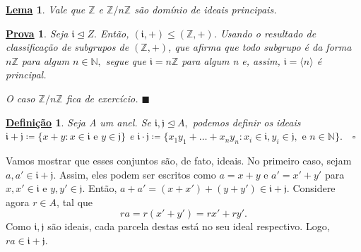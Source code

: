 \documentclass{article}
\newtheorem*{def*}{\underline{Defini\c c\~ao}}
\newtheorem*{lemma*}{\underline{Lema}}
\newtheorem*{proof*}{\underline{Prova}}
\renewcommand\qedsymbol{$\blacksquare$}
\begin{document}
\begin{lemma*}
  Vale que \(\mathbb{Z}\) e \(\mathbb{Z}/n \mathbb{Z}\) são domínio de ideais principais.
\end{lemma*}
\begin{proof*}
  Seja \(\mathfrak{i} \trianglelefteq{Z}.\) Então, \((\mathfrak{i}, +)\leq (\mathbb{Z}, +)\). Usando o resultado
  de classificação de subgrupos de \((\mathbb{Z}, +)\), que afirma que todo subgrupo é da forma \(n \mathbb{Z}\) para
  algum \(n\in \mathbb{N},\) segue que \(\mathfrak{i} = n \mathbb{Z}\) para algum n e, assim, \(\mathfrak{i} = \langle n \rangle\) 
  é principal.

  O caso \(\mathbb{Z}/n \mathbb{Z}\) fica de exercício. \qedsymbol
\end{proof*}
\begin{def*}
  Seja A um anel. Se \(\mathfrak{i}, \mathfrak{j} \trianglelefteq{A},\) podemos definir os ideais \(\mathfrak{i} + \mathfrak{j}\coloneqq \{x+y:x\in \mathfrak{i}\text{ e } y\in \mathfrak{j}\}\)
  e \(\mathfrak{i} \cdot \mathfrak{j}\coloneqq \{x_{1}y_{1}+\dotsc+x_{n}y_{n}: x_{i}\in \mathfrak{i}, y_{i}\in \mathfrak{j}, \text{ e } n\in \mathbb{N}\}.\quad\square\)
\end{def*}
Vamos mostrar que esses conjuntos são, de fato, ideais. No primeiro caso, sejam \(a, a'\in \mathfrak{i} + \mathfrak{j}.\)
Assim, eles podem ser escritos como \(a = x + y\) e \(a'= x'+ y'\) para \(x, x'\in \mathfrak{i}\) e \(y, y'\in \mathfrak{j}.\)
Então, \(a + a' = (x + x') + (y + y')\in \mathfrak{i} + \mathfrak{j}.\) Considere agora \(r\in A\), tal que 
\[
  ra = r(x'+y') = rx' + ry'.
\]
Como \(\mathfrak{i}, \mathfrak{j}\) são ideais, cada parcela destas está no seu ideal respectivo.
Logo, \(ra \in \mathfrak{i} + \mathfrak{j}.\)
\end{document}
